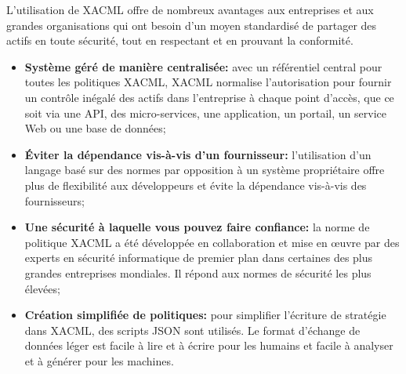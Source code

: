 L'utilisation de XACML offre de nombreux avantages aux entreprises et aux grandes organisations qui ont besoin d'un moyen standardisé de partager des actifs en toute sécurité, tout en respectant et en prouvant la conformité.
\begin{itemize}

\item \textbf{Système géré de manière centralisée:} avec un référentiel central pour toutes les politiques XACML, XACML normalise l'autorisation pour fournir un contrôle inégalé des actifs dans l'entreprise à chaque point d'accès, que ce soit via une API, des micro-services, une application, un portail, un service Web ou une base de données;

\item \textbf{Éviter la dépendance vis-à-vis d'un fournisseur:} l'utilisation d'un langage basé sur des normes par opposition à un système propriétaire offre plus de flexibilité aux développeurs et évite la dépendance vis-à-vis des fournisseurs;

\item \textbf{Une sécurité à laquelle vous pouvez faire confiance:} la norme de politique XACML a été développée en collaboration et mise en œuvre par des experts en sécurité informatique de premier plan dans certaines des plus grandes entreprises mondiales. Il répond aux normes de sécurité les plus élevées;

\item \textbf{Création simplifiée de politiques:} pour simplifier l'écriture de stratégie dans XACML, des scripts JSON sont utilisés. Le format d'échange de données léger est facile à lire et à écrire pour les humains et facile à analyser et à générer pour les machines.
\end{itemize}

\label{sectionHXACL}

\label{sectionParapheur}

\label{sectionParapheurE}


